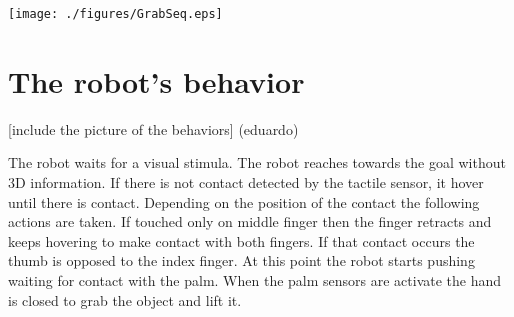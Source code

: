 \begin{figure*}[tb]
\centerline{
\texttt{[image: ./figures/GrabSeq.eps]}
} \caption{An example. Sequence of the robot grasping a porcelain
cup. Frame 1: the cup is presented to the robot. Frame 2: the
robot reaches for the cup. Frames 3 to 6:  the robot explores the
space and uses tactile feedback to find the object and adjust the
position of the hand around it. Frames 7 and 8: the robot grasps
and lifts the cup.} \label{fig:sequence}
\end{figure*}

\section{The robot's behavior}
\label{sec:behavior}

 [include the picture of the behaviors]
(eduardo)

 The robot waits for a visual stimula. The robot reaches towards
 the goal without 3D information. If there is not contact detected
 by the tactile sensor, it hover until there is contact.
 Depending on the position of the contact the following actions
 are taken. If touched only on middle finger then the finger
 retracts and keeps hovering to make contact with both fingers.
 If that contact occurs the thumb is opposed to the index finger.
 At this point the robot starts pushing waiting for contact with
 the palm. When the palm sensors are activate the hand is closed
 to grab the object and lift it.


